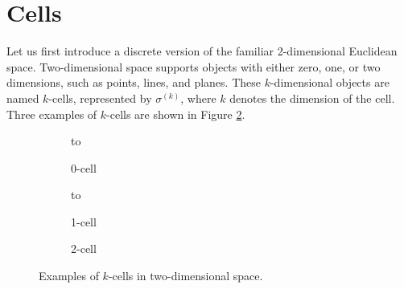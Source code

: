 \section{Cells}

Let us first introduce a discrete version of the familiar 2-dimensional Euclidean space. Two-dimensional space supports objects with either zero, one, or two dimensions, such as points, lines, and planes. These $k$-dimensional objects are named $k$-cells, represented by $\sigma^{(k)}$, where $k$ denotes the dimension of the cell. Three examples of $k$-cells are shown in Figure \ref{fig:cells}.
\begin{figure}[ht]
    \newsavebox\boxCell
    \centering
    \begin{subfigure}[c]{0.3\textwidth}
        \centering
        \vbox to \ht{}
        \caption{0-cell}
    \end{subfigure}
    \begin{subfigure}[c]{0.3\textwidth}
        \centering
        \vbox to \ht{}
        \caption{1-cell}
    \end{subfigure}
    \begin{subfigure}[c]{0.3\textwidth}
        \centering
        \usebox{\boxCell}
        \caption{2-cell}
        \label{fig:2cell}
    \end{subfigure}
    \caption{Examples of $k$-cells in two-dimensional space.}
    \label{fig:cells}
\end{figure}

